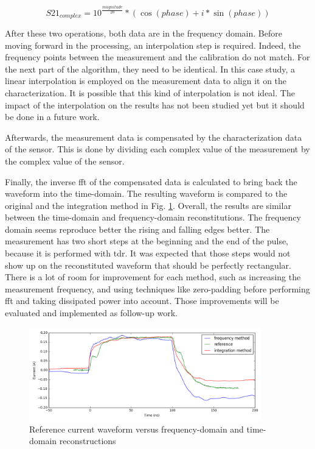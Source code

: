 \begin{equation} \label{eq:to-complex}
  S21_{complex} = 10^{\frac{magnitude}{20}} * (\cos(phase) + i*\sin(phase))
\end{equation}

After these two operations, both data are in the frequency domain.
Before moving forward in the processing, an interpolation step is required.
Indeed, the frequency points between the measurement and the calibration do not match.
For the next part of the algorithm, they need to be identical.
In this case study, a linear interpolation is employed on the measurement data to align it on the characterization.
It is possible that this kind of interpolation is not ideal.
The impact of the interpolation on the results has not been studied yet but it should be done in a future work.

Afterwards, the measurement data is compensated by the characterization data of the sensor.
This is done by dividing each complex value of the measurement by the complex value of the sensor.

Finally, the inverse \gls{fft} of the compensated data is calculated to bring back the waveform into the time-domain.
The resulting waveform is compared to the original and the integration method in Fig. \ref{fig:freq-domain-reconstructed}.
Overall, the results are similar between the time-domain and frequency-domain reconstitutions.
The frequency domain seems reproduce better the rising and falling edges better.
The measurement has two short steps at the beginning and the end of the pulse, because it is performed with \gls{tdr}.
It was expected that those steps would not show up on the reconstituted waveform that should be perfectly rectangular.
There is a lot of room for improvement for each method, such as increasing the measurement frequency, and using techniques like zero-padding before performing \gls{fft} and taking dissipated power into account.
Those improvements will be evaluated and implemented as follow-up work.

\begin{figure}[!h]
  \centering
  \includegraphics[width=0.9\textwidth]{src/3/figures/final_comparison_reconstructions.png}
  \caption{Reference current waveform versus frequency-domain and time-domain reconstructions}
  \label{fig:freq-domain-reconstructed}
\end{figure}

